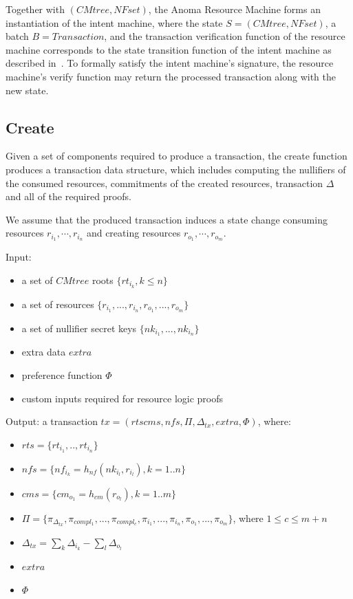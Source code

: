 \documentclass[
    11pt,            %
    techreport,        %
    affiltop,       %
]{art}
\begin{document}
Together with $(CMtree, NFset)$, the Anoma Resource Machine forms an instantiation of the intent machine, where the state $S = (CMtree, NFset)$, a batch $B = Transaction$, and the transaction verification function of the resource machine corresponds to the state transition function of the intent machine as described in~\cite{art-2024-intent-machine}. To formally satisfy the intent machine's signature, the resource machine's verify function may return the processed transaction along with the new state.

\subsection{Create}

Given a set of components required to produce a transaction, the create function produces a transaction data structure, which includes computing the nullifiers of the consumed resources, commitments of the created resources, transaction $\Delta$ and all of the required proofs.

We assume that the produced transaction induces a state change consuming resources $r_{i_1},\cdots, r_{i_n}$ and creating resources $r_{o_1}, \cdots, r_{o_m}$.

Input: 
\begin{itemize}
    \item a set of $CMtree$ roots $\{rt_{i_k}, k \leq n\}$
    \item a set of resources $\{r_{i_1},...,r_{i_n}, r_{o_1},...,r_{o_m}\}$
    \item a set of nullifier secret keys $\{nk_{i_1},...,nk_{i_n}\}$
    \item extra data $extra$
    \item preference function $\Phi$
    \item custom inputs required for resource logic proofs
\end{itemize}

Output: a transaction $tx = (rts cms, nfs, \Pi, \Delta_{tx}, extra, \Phi)$, where:
\begin{itemize}
    \item $rts= \{rt_{i_1},..,rt_{i_n}\}$
    \item $nfs = \{nf_{i_k} = h_{nf}(nk_{i_l}, r_{i_l}), k = 1..n\}$
    \item $cms = \{cm_{o_1} = h_{cm}(r_{o_l}), k = 1..m\}$
    \item $\Pi = \{\pi_{\Delta_{tx}}, \pi_{compl_1}, ..., \pi_{compl_c}, \pi_{i_1}, ..., \pi_{i_n}, \pi_{o_1}, ...,\pi_{o_m}\}$, where $1 \leq c \leq m + n$
    \item $\Delta_{tx} = \sum_k{\Delta_{i_k}} - \sum_l{\Delta_{o_l}}$
    \item $extra$
    \item $\Phi$
\end{itemize}
\end{document}
